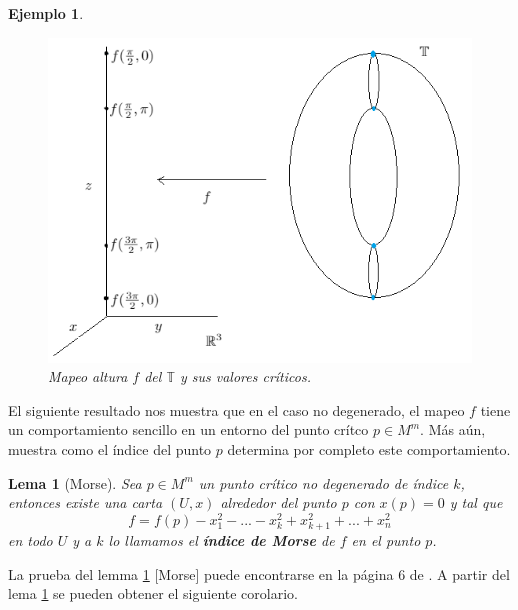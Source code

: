 \documentclass[a4paper,10pt]{book}
\newtheorem{lema}{Lema}[chapter]
\newtheorem{eje}{Ejemplo}[chapter]
\begin{document}
\begin{eje}
\begin{figure}[!ht]
\centering
\includegraphics[scale=0.6]{ToroMorse.png}
\caption{Mapeo altura $f$ del $\mathbb{T}$ y sus valores cr\'iticos.}
\label{ToroMorse}
\end{figure}
\end{eje}

El siguiente resultado nos muestra que en el caso no degenerado, el mapeo $f$ tiene un comportamiento sencillo en un entorno del punto cr\'itco $p\in M^{m}$. M\'as a\'un, muestra como el \'indice del punto $p$ determina por completo este comportamiento.

\begin{lema}[Morse]\label{lemaMorse}
Sea $p\in M^{m}$ un punto cr\'itico no degenerado de \'indice $k$, entonces existe una carta $(U,x)$ alrededor del punto $p$ con $x(p)=0$ y tal que
\begin{equation}\label{EqLemaMorse}
f = f(p)-x_{1}^{2}-...-x_{k}^{2}+x_{k+1}^{2}+...+x_{n}^{2}                
\end{equation}
en todo $U$ y a $k$ lo llamamos el {\bfseries \'indice de Morse} de $f$ en el punto $p$.
\end{lema}

La prueba del lemma \ref{lemaMorse} [Morse] puede encontrarse en la p\'agina 6 de \cite{Matsumoto}. A partir del lema \ref{lemaMorse} se pueden obtener el siguiente corolario.  

\end{document}
